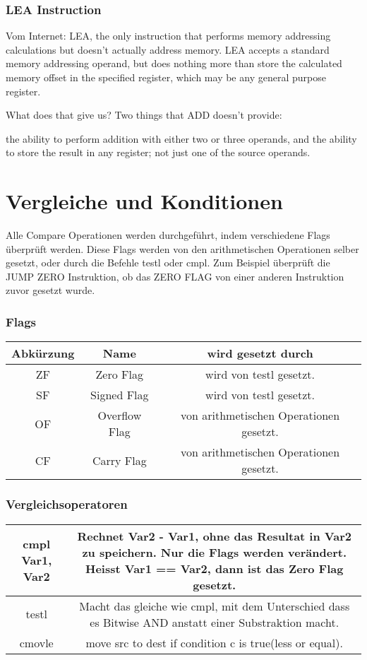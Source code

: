 \documentclass[a4paper, 11pt]{article}
\begin{document}
\subsubsection{LEA Instruction}
Vom Internet: LEA, the only instruction that performs memory addressing calculations but doesn't actually address memory. LEA accepts a standard memory addressing operand, but does nothing more than store the calculated memory offset in the specified register, which may be any general purpose register.

What does that give us? Two things that ADD doesn't provide:

the ability to perform addition with either two or three operands, and
the ability to store the result in any register; not just one of the source operands.

\section{Vergleiche und Konditionen}
Alle Compare Operationen werden durchgeführt, indem verschiedene Flags überprüft werden. Diese Flags werden von den arithmetischen Operationen selber gesetzt, oder durch die Befehle testl oder cmpl. Zum Beispiel überprüft die JUMP ZERO Instruktion, ob das ZERO FLAG von einer anderen Instruktion zuvor gesetzt wurde.

\subsubsection{Flags}
\begin{tabular}{|c|c|c|}
	\hline
	Abkürzung & Name & wird gesetzt durch \\\hline 
	ZF & Zero Flag & wird von testl gesetzt.\\\hline
	SF & Signed Flag & wird von testl gesetzt.\\\hline
	OF & Overflow Flag & von arithmetischen Operationen gesetzt.\\\hline
	CF & Carry Flag & von arithmetischen Operationen gesetzt.\\\hline
\end{tabular}

\subsubsection{Vergleichsoperatoren}
\begin{tabular}{|c|c|}
	\hline
	cmpl Var1, Var2 & Rechnet Var2 - Var1, ohne das Resultat in Var2 zu speichern. Nur die Flags werden verändert. Heisst Var1 == Var2, dann ist das Zero Flag gesetzt.\\\hline
	testl & Macht das gleiche wie cmpl, mit dem Unterschied dass es Bitwise AND anstatt einer Substraktion macht.\\\hline
	{\color{red}cmovle} & move src to dest if condition c is true(less or equal).\\\hline
\end{tabular}
\end{document}
